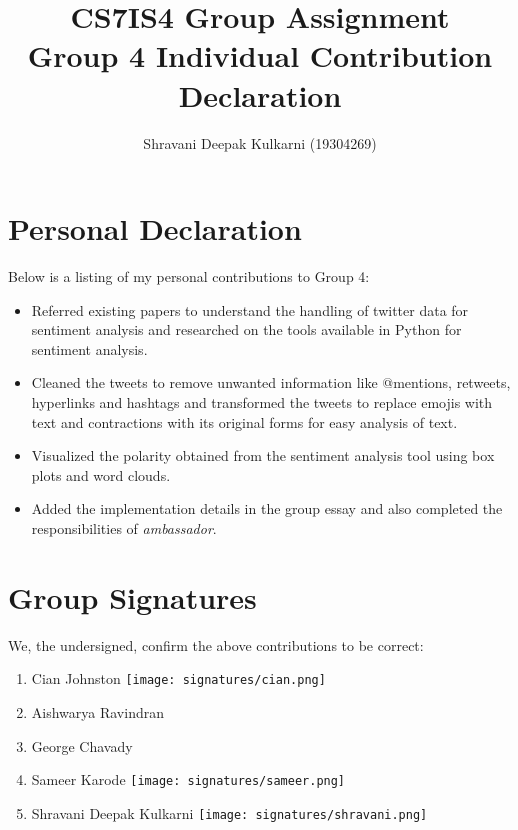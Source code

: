 \documentclass[a4paper,10pt]{article}
\begin{document}
\title{
    CS7IS4 Group Assignment \\
    \large Group 4 Individual Contribution Declaration
}
\author{
    Shravani Deepak Kulkarni (19304269)
}

\maketitle

\section{Personal Declaration}

Below is a listing of my personal contributions to Group 4:

\begin{itemize}
    \item{
    	Referred existing papers to understand the handling of twitter data for sentiment analysis and researched on the tools available in Python for sentiment analysis.
    }
    \item{
    	Cleaned the tweets to remove unwanted information like @mentions, retweets, hyperlinks and hashtags and transformed the tweets to replace emojis with text and contractions with its original forms for easy analysis of text.
	}
    \item{
    	Visualized the polarity obtained from the sentiment analysis tool using box plots and word clouds.
    }
    \item{
    	Added the implementation details in the group essay and also completed the responsibilities of \textit{ambassador}.
    }
    
\end{itemize}

\section{Group Signatures}

We, the undersigned, confirm the above contributions to be correct:

\begin{enumerate}
    \item{
        Cian Johnston \texttt{[image: signatures/cian.png]}
    }
    \item{
        Aishwarya Ravindran
    }
    \item{
        George Chavady 
    }
    \item{
        Sameer Karode \texttt{[image: signatures/sameer.png]}
    }
    \item{
        Shravani Deepak Kulkarni \texttt{[image: signatures/shravani.png]}
    }

\end{enumerate}
\end{document}
